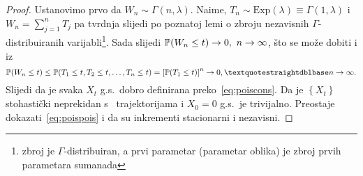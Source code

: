 \documentclass[main.tex]{subfiles}
\begin{document}
\begin{proof}
	Ustanovimo prvo da \( W_n \sim \Gamma(n, \lambda) \). Naime, \( T_n \sim \mathrm{Exp}(\lambda) \equiv \Gamma(1, \lambda) \) i
	\( W_n = \sum_{j=1}^n T_j \) pa tvrdnja slijedi po poznatoj lemi o zbroju nezavisnih \( \Gamma \)-distribuiranih varijabli\footnote{zbroj
		je \( \Gamma \)-distribuiran, a prvi parametar (parametar oblika) je zbroj prvih parametara sumanada}. Sada slijedi \( \mathbb{P}(W_n \le t) \rightarrow 0,\ n \rightarrow \infty \), što se
	može dobiti i iz
	\[
		\P(W_n \le t) \le \P(T_1 \le t, T_2 \le t, \ldots, T_n \le t) = \left[ \P(T_1 \le t) \right]^n \rightarrow 0, \textquotestraightdblbase n \ub.
	\]
	Slijedi da je svaka \( X_t \) g.s.\ dobro definirana preko~\eqref{eq:poiscons}. Da je \( \left\{ X_t \right\} \) stohastički neprekidan
	s \cadlag \ trajektorijama i \( X_0 = 0 \) g.s.\ je trivijalno. Preostaje dokazati~\eqref{eq:poispois} i da su inkrementi stacionarni i nezavisni.
	

\end{proof}
\end{document}
